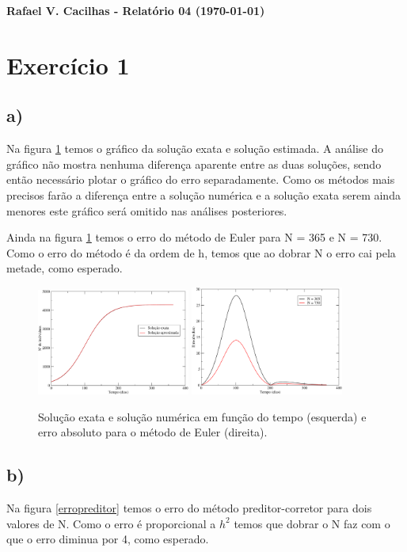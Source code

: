 \documentclass[a4wide]{report}
\begin{document}
\noindent
{\bf Rafael V. Cacilhas  - Relatório 04 (\today)}

\vspace{0.5cm}

\section*{Exercício 1}

\subsection*{a) }
Na figura \ref{solucao} temos o gráfico da solução exata e solução estimada. A análise do gráfico não mostra nenhuma diferença aparente entre as duas soluções, sendo então necessário plotar o gráfico do erro separadamente. Como os métodos mais precisos farão a diferença entre a solução numérica e a solução exata serem ainda menores este gráfico será omitido nas análises posteriores.

Ainda na figura \ref{solucao} temos o erro do método de Euler para N = 365 e N = 730. Como o erro do método é da ordem de h, temos que ao dobrar N o erro cai pela metade, como esperado.


\begin{figure}[!htb]
\centering
\includegraphics[width=0.447\textwidth]{1a.pdf}
\includegraphics[width=0.447\textwidth]{1erro2.pdf}
\caption{Solução exata e solução numérica em função do tempo (esquerda) e erro absoluto para o método de Euler (direita).}
\label{solucao}
\end{figure}



\subsection*{b)}
 Na figura \ref{erropreditor} temos o erro do método preditor-corretor para dois valores de N. Como o erro é proporcional a $h^2$ temos que dobrar o N faz com o que o erro diminua por 4, como esperado. 
\end{document}
